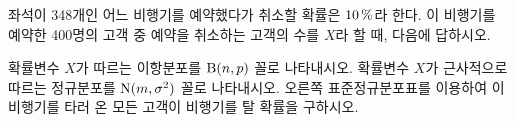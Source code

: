 \noindent\begin{minipage}[t]{0.58\linewidth}\vspace{0pt}\raggedright 좌석이 348개인 어느 비행기를 예약했다가 취소할 확률은 $10\mkern3mu \%$라 한다. 이 비행기를 예약한 400명의 고객 중 예약을 취소하는 고객의 수를 $X$라 할 때, 다음에 답하시오. \end{minipage}\hfill\begin{minipage}[t]{0.4\linewidth}\vspace{0pt}\centering \resizebox{\ifdim\width>\linewidth\linewidth\else\width\fi}{!}{}\end{minipage}\par
{} 확률변수 $X$가 따르는 이항분포를 $\mathrm{B}(n{,}\mkern3mu\mathopen{}p)$ 꼴로 나타내시오.
 확률변수 $X$가 근사적으로 따르는 정규분포를 $\mathrm{N}(m{,}\mkern3mu\mathopen{}\sigma^2)$ 꼴로 나타내시오.
 오른쪽 표준정규분포표를 이용하여 이 비행기를 타러 온 모든 고객이 비행기를 탈 확률을 구하시오.
